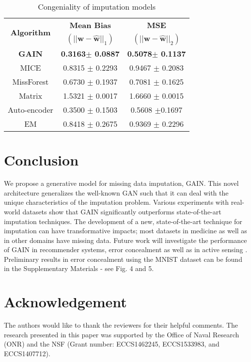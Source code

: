 \documentclass{article}
\begin{document}
\begin{table}[t!]
	\renewcommand{\arraystretch}{1.3}
	\caption{Congeniality of imputation models}
	\label{tab:congeniality}
	\centering
	\begin{tabular}{|c|c|c|}
		\toprule
		\multirow{2}{*}{\textbf{Algorithm}} & \textbf{Mean Bias} & \textbf{MSE} \\
		& $(||\mathbf{w} - \hat{\mathbf{w}}||_1)$ & $(||\mathbf{w} - \hat{\mathbf{w}}||_2)$\\
		\midrule
		\textbf{GAIN} & \textbf{0.3163$\pm$ 0.0887} & \textbf{0.5078$\pm$ 0.1137} \\ \midrule
		MICE   & 0.8315 $\pm$ 0.2293 & 0.9467 $\pm$ 0.2083 \\
		MissForest & 0.6730 $\pm$ 0.1937 & 0.7081 $\pm$ 0.1625 \\
		Matrix & 1.5321 $\pm$ 0.0017 & 1.6660 $\pm$ 0.0015 \\
		Auto-encoder & 0.3500 $\pm$ 0.1503 & 0.5608 $\pm$0.1697  \\
		EM  & 0.8418 $\pm$ 0.2675 & 0.9369 $\pm$ 0.2296 \\
		\bottomrule
	\end{tabular}
\end{table}

\section{Conclusion}\label{sect:conclusion}
We propose a generative model for missing data imputation, GAIN. This novel architecture generalizes the well-known GAN such that it can deal with the unique characteristics of the imputation problem. Various experiments with real-world datasets show that GAIN significantly outperforms state-of-the-art imputation techniques. The development of a new, state-of-the-art technique for imputation can have transformative impacts; most datasets in medicine as well as in other domains have missing data. Future work will investigate the performance of GAIN in recommender systems, error concealment as well as in active sensing \cite{activesensing}. Preliminary results in error concealment using the MNIST dataset \cite{mnist} can be found in the Supplementary Materials - see Fig. 4 and 5. 

\newpage
\section*{Acknowledgement}
The authors would like to thank the reviewers for their helpful comments. The research presented in this paper was supported by the Office of Naval Research (ONR) and the NSF (Grant number: ECCS1462245, ECCS1533983, and ECCS1407712).
\end{document}
